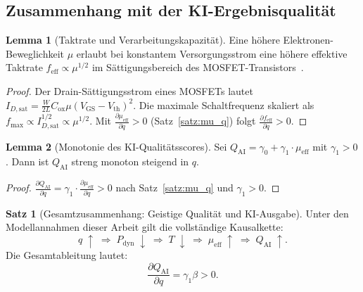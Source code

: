 ﻿\documentclass[a4paper,12pt]{article}
\theoremstyle{definition}
\newtheorem{satz}{Satz}
\newtheorem{lemma}{Lemma}
\begin{document}
\subsection{Zusammenhang mit der KI-Ergebnisqualität}

\begin{lemma}[Taktrate und Verarbeitungskapazität]
\label{lem:takt}
Eine höhere Elektronen-Beweglichkeit $\mu$ erlaubt bei konstantem Versorgungsstrom
eine höhere effektive Taktrate $f_{\mathrm{eff}} \propto \mu^{1/2}$ im Sättigungsbereich
des MOSFET-Transistors~\cite{Lundstrom2009}.
\end{lemma}

\begin{proof}
Der Drain-Sättigungsstrom eines MOSFETs lautet
$I_{D,\mathrm{sat}} = \tfrac{W}{2L} C_{\mathrm{ox}} \mu (V_{\mathrm{GS}} - V_{\mathrm{th}})^2$.
Die maximale Schaltfrequenz skaliert als $f_{\mathrm{max}} \propto I_{D,\mathrm{sat}}^{1/2} \propto \mu^{1/2}$.
Mit $\frac{\partial \mu_{\mathrm{eff}}}{\partial q} > 0$ (Satz~\ref{satz:mu_q}) folgt
$\frac{\partial f_{\mathrm{eff}}}{\partial q} > 0$. \qedhere
\end{proof}

\begin{lemma}[Monotonie des KI-Qualitätsscores]
\label{lem:quality}
Sei $Q_{\mathrm{AI}} = \gamma_0 + \gamma_1 \cdot \mu_{\mathrm{eff}}$ mit $\gamma_1 > 0$.
Dann ist $Q_{\mathrm{AI}}$ streng monoton steigend in $q$.
\end{lemma}

\begin{proof}
$\frac{\partial Q_{\mathrm{AI}}}{\partial q}
= \gamma_1 \cdot \frac{\partial \mu_{\mathrm{eff}}}{\partial q} > 0$
nach Satz~\ref{satz:mu_q} und $\gamma_1 > 0$. \qedhere
\end{proof}

\begin{satz}[Gesamtzusammenhang: Geistige Qualität und KI-Ausgabe]
\label{satz:gesamt}
Unter den Modellannahmen dieser Arbeit gilt die vollständige Kausalkette:
\[
q \;\uparrow \;\Longrightarrow\; P_{\mathrm{dyn}} \;\downarrow \;\Longrightarrow\; T \;\downarrow
\;\Longrightarrow\; \mu_{\mathrm{eff}} \;\uparrow \;\Longrightarrow\; Q_{\mathrm{AI}} \;\uparrow.
\]
Die Gesamtableitung lautet:
\[
\frac{\partial Q_{\mathrm{AI}}}{\partial q}
= \gamma_1 \beta > 0.
\]
\end{satz}
\end{document}
